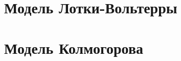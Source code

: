 \documentclass[14pt, a4paper, titlepage, fleqn]{extarticle}
\begin{document}
    
    
    \tableofcontents

    \pagebreak

    
    
    \pagebreak
    
    \section{Модель Лотки-Вольтерры}
    

    \pagebreak

    

    \pagebreak
    
    \section{Модель Колмогорова}
    

    \pagebreak

    

    \pagebreak

    

    \pagebreak

    
\end{document}
